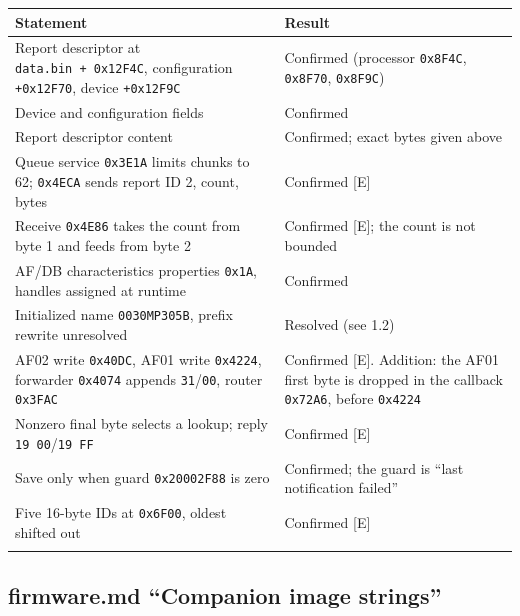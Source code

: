 {\def\LTcaptype{none} %
\begin{longtable}[]{@{}
  >{\raggedright\arraybackslash}p{}
  >{\raggedright\arraybackslash}p{}@{}}
\toprule\noalign{}
\begin{minipage}[b]{\linewidth}\raggedright
Statement
\end{minipage} & \begin{minipage}[b]{\linewidth}\raggedright
Result
\end{minipage} \\
\midrule\noalign{}
\endhead
\bottomrule\noalign{}
\endlastfoot
Report descriptor at \texttt{data.bin\ +\ 0x12F4C}, configuration
\texttt{+0x12F70}, device \texttt{+0x12F9C} & Confirmed (processor
\texttt{0x8F4C}, \texttt{0x8F70}, \texttt{0x8F9C}) \\
Device and configuration fields & Confirmed \\
Report descriptor content & Confirmed; exact bytes given above \\
Queue service \texttt{0x3E1A} limits chunks to 62; \texttt{0x4ECA} sends
report ID 2, count, bytes & Confirmed {[}E{]} \\
Receive \texttt{0x4E86} takes the count from byte 1 and feeds from byte
2 & Confirmed {[}E{]}; the count is not bounded \\
AF/DB characteristics properties \texttt{0x1A}, handles assigned at
runtime & Confirmed \\
Initialized name \texttt{0030MP305B}, prefix rewrite unresolved &
Resolved (see 1.2) \\
AF02 write \texttt{0x40DC}, AF01 write \texttt{0x4224}, forwarder
\texttt{0x4074} appends \texttt{31}/\texttt{00}, router \texttt{0x3FAC}
& Confirmed {[}E{]}. Addition: the AF01 first byte is dropped in the
callback \texttt{0x72A6}, before \texttt{0x4224} \\
Nonzero final byte selects a lookup; reply
\texttt{19\ 00}/\texttt{19\ FF} & Confirmed {[}E{]} \\
Save only when guard \texttt{0x20002F88} is zero & Confirmed; the guard
is ``last notification failed'' \\
Five 16-byte IDs at \texttt{0x6F00}, oldest shifted out & Confirmed
{[}E{]} \\*
\end{longtable}
}

\subsection{firmware.md ``Companion image
strings''}\label{firmware.md-companion-image-strings}

